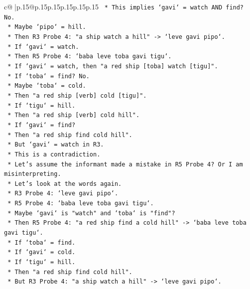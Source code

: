\documentclass{article}
\begin{document}
{\begin{supertabular}{c@{$\;$}|p{.15\linewidth}@{}p{.15\linewidth}p{.15\linewidth}p{.15\linewidth}p{.15\linewidth}p{.15\linewidth}}
{{{\texttt{        *   This implies `gavi` = watch AND find? No.} \\
\texttt{        *   Maybe `pipo` = hill.} \\
\texttt{        *   Then R3 Probe 4: "a ship watch a hill" {-}> `leve gavi pipo`.} \\
\texttt{        *   If `gavi` = watch.} \\
\texttt{        *   Then R5 Probe 4: `baba leve toba gavi tigu`.} \\
\texttt{        *   If `gavi` = watch, then "a red ship {[}toba{]} watch {[}tigu{]}".} \\
\texttt{        *   If `toba` = find? No.} \\
\texttt{        *   Maybe `toba` = cold.} \\
\texttt{        *   Then "a red ship {[}verb{]} cold {[}tigu{]}".} \\
\texttt{        *   If `tigu` = hill.} \\
\texttt{        *   Then "a red ship {[}verb{]} cold hill".} \\
\texttt{        *   If `gavi` = find?} \\
\texttt{        *   Then "a red ship find cold hill".} \\
\texttt{        *   But `gavi` = watch in R3.} \\
\texttt{        *   This is a contradiction.} \\
\texttt{        *   Let's assume the informant made a mistake in R5 Probe 4? Or I am misinterpreting.} \\
\texttt{        *   Let's look at the words again.} \\
\texttt{        *   R3 Probe 4: `leve gavi pipo`.} \\
\texttt{        *   R5 Probe 4: `baba leve toba gavi tigu`.} \\
\texttt{        *   Maybe `gavi` is "watch" and `toba` is "find"?} \\
\texttt{        *   Then R5 Probe 4: "a red ship find a cold hill" {-}> `baba leve toba gavi tigu`.} \\
\texttt{        *   If `toba` = find.} \\
\texttt{        *   If `gavi` = cold.} \\
\texttt{        *   If `tigu` = hill.} \\
\texttt{        *   Then "a red ship find cold hill".} \\
\texttt{        *   But R3 Probe 4: "a ship watch a hill" {-}> `leve gavi pipo`.} \\
}}}
\end{supertabular}}
\end{document}
